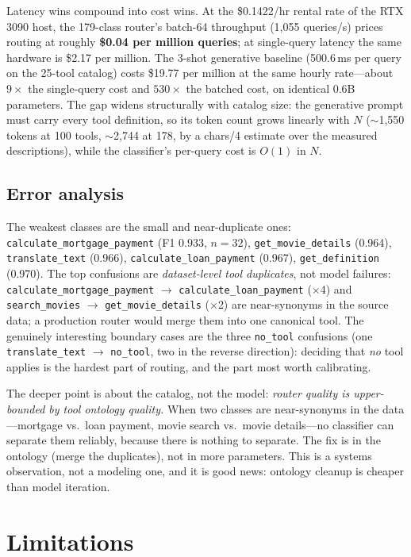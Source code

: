 \documentclass{article}
\begin{document}
Latency wins compound into cost wins. At the \$0.1422/hr rental rate of the
RTX 3090 host, the 179-class router's batch-64 throughput (1{,}055
queries/s) prices routing at roughly \textbf{\$0.04 per million queries};
at single-query latency the same hardware is \$2.17 per million. The 3-shot
generative baseline (500.6\,ms per query on the 25-tool catalog) costs
\$19.77 per million at the same hourly rate---about $9\times$ the
single-query cost and $530\times$ the batched cost, on identical 0.6B
parameters. The gap widens structurally with catalog size: the generative
prompt must carry every tool definition, so its token count grows linearly
with $N$ ($\sim$1{,}550 tokens at 100 tools, $\sim$2{,}744 at 178, by a
chars/4 estimate over the measured descriptions), while the classifier's
per-query cost is $O(1)$ in $N$.

\subsection{Error analysis}
\label{sec:errors}

The weakest classes are the small and near-duplicate ones:
\texttt{calculate\_mortgage\_payment} (F1 $0.933$, $n{=}32$),
\texttt{get\_movie\_details} (0.964), \texttt{translate\_text} (0.966),
\texttt{calculate\_loan\_payment} (0.967), \texttt{get\_definition} (0.970).
The top confusions are \emph{dataset-level tool duplicates}, not model
failures: \texttt{calculate\_mortgage\_payment} $\to$
\texttt{calculate\_loan\_payment} ($\times$4) and \texttt{search\_movies}
$\to$ \texttt{get\_movie\_details} ($\times$2) are near-synonyms in the source
data; a production router would merge them into one canonical tool. The
genuinely interesting boundary cases are the three \texttt{no\_tool}
confusions (one \texttt{translate\_text} $\to$ \texttt{no\_tool}, two in the
reverse direction): deciding that \emph{no} tool applies is the hardest part
of routing, and the part most worth calibrating.

The deeper point is about the catalog, not the model: \emph{router quality is
upper-bounded by tool ontology quality.} When two classes are near-synonyms
in the data---mortgage vs.\ loan payment, movie search vs.\ movie
details---no classifier can separate them reliably, because there is nothing
to separate. The fix is in the ontology (merge the duplicates), not in more
parameters. This is a systems observation, not a modeling one, and it is good
news: ontology cleanup is cheaper than model iteration.

\section{Limitations}
\label{sec:limitations}
\end{document}
